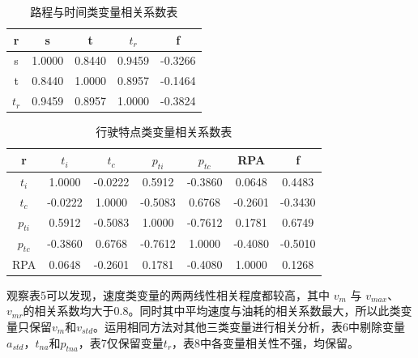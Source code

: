 \documentclass[bwprint]{gmcmthesis}
\begin{document}
\begin{table}[htbp]
\caption{路程与时间类变量相关系数表}
\centering
\begin{tabular}{c c c c c}%
\hline  %
r & s & t & $t_r$ & f\\
\hline
s	&1.0000	&0.8440	&0.9459	&-0.3266\\
t	&0.8440	&1.0000	&0.8957	&-0.1464\\
$t_r$	&0.9459	&0.8957&	1.0000	&-0.3824\\

\hline  %
\end{tabular}
\end{table}
\begin{table}[htbp]
\caption{行驶特点类变量相关系数表}
\centering
\begin{tabular}{c c c c c c c}%
\hline  %
r	& $t_i$	& $t_c$	& $p_{ti}$ &	$p_{tc}$	&RPA	&f\\
\hline
$t_i$ &1.0000	&-0.0222&	0.5912	&-0.3860&	0.0648&	0.4483\\
$t_c$	& -0.0222&	1.0000	&-0.5083&	0.6768	&-0.2601	&-0.3430\\
$p_{ti}$ & 0.5912&	-0.5083&	1.0000&	-0.7612&	0.1781&	0.6749\\
$p_{tc}$	& -0.3860&	0.6768&	-0.7612&	1.0000	&-0.4080&	-0.5010\\
RPA	& 0.0648&	-0.2601	&0.1781&	-0.4080&	1.0000	&0.1268\\

\hline  %
\end{tabular}
\end{table}

观察表5可以发现，速度类变量的两两线性相关程度都较高，其中 $v_m$ 与 $v_{max}$、$v_{mr}$的相关系数均大于0.8。同时其中平均速度与油耗的相关系数最大，所以此类变量只保留$v_m$和$v_{std}$。运用相同方法对其他三类变量进行相关分析，表6中剔除变量$a_{std}$，$t_{na}$和$p_{tna}$，表7仅保留变量$t_r$，表8中各变量相关性不强，均保留。
\end{document}
